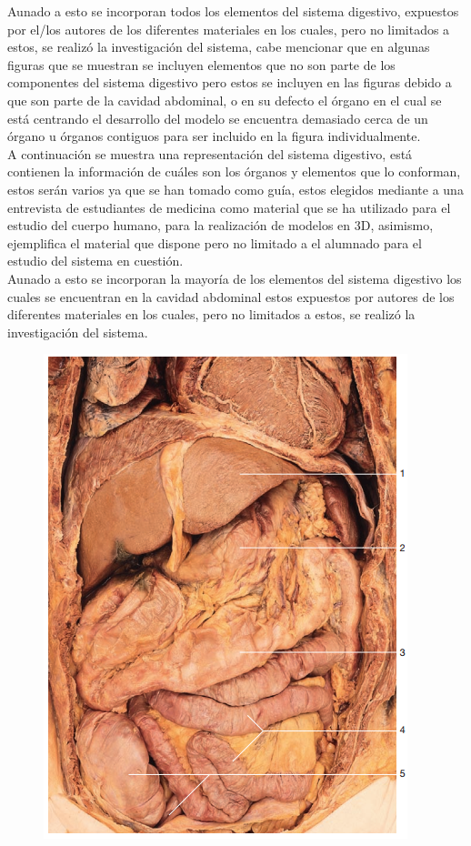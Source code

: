 Aunado a esto se incorporan todos los elementos del sistema digestivo, expuestos por el/los autores de los diferentes materiales en los cuales, pero no limitados 
a estos, se realizó la investigación del sistema, cabe mencionar que en algunas figuras que se muestran se incluyen elementos que no son parte de los componentes 
del sistema digestivo pero estos se incluyen en las figuras debido a que son parte de la cavidad abdominal, o en su defecto el órgano en el cual se está centrando 
el desarrollo del modelo se encuentra demasiado cerca de un órgano u órganos contiguos para ser incluido en la figura individualmente.\\
A continuación se muestra una representación del sistema digestivo, está contienen la información de cuáles son los órganos y elementos que lo conforman, estos serán 
varios ya que se han tomado como guía, estos elegidos mediante a una entrevista de estudiantes de medicina como material que se ha utilizado para el estudio del cuerpo 
humano, para la realización de modelos en 3D, asimismo, ejemplifica el material que dispone pero no limitado a el alumnado para el estudio del sistema en cuestión.\\
Aunado a esto se incorporan la mayoría de los elementos del sistema digestivo los cuales se encuentran en la cavidad abdominal estos expuestos por autores de los 
diferentes materiales en los cuales, pero no limitados a estos, se realizó la investigación del sistema.\\
\begin{figure}[H]
	\begin{center}
 		\includegraphics[width = .3\textwidth]{source/images/image72.png}
	\end{center} 
\end{figure}

